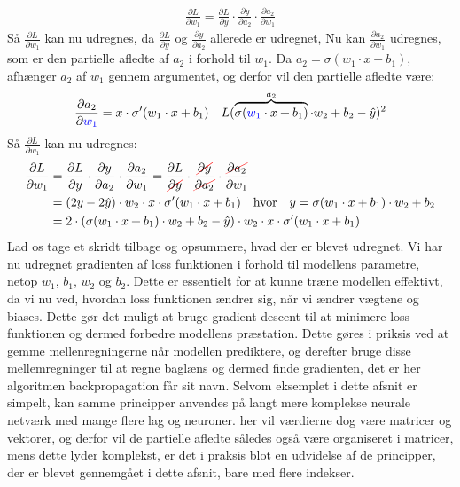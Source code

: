 \documentclass{article}
\newcommand\Ccancel[2][black]{
    \let\OldcancelColor\CancelColor
    \renewcommand\CancelColor{\color{#1}}
    \cancel{#2}
    \renewcommand\CancelColor{\OldcancelColor}
}
\begin{document}
\begin{align}
  \frac{\partial L}{\partial w_1} = \frac{\partial L}{\partial y} \cdot \frac{\partial y}{\partial a_2} \cdot \frac{\partial a_2}{\partial w_1}
\end{align}
Så $\frac{\partial L}{\partial w_1}$ kan nu udregnes, da $\frac{\partial L}{\partial y}$ og $\frac{\partial y}{\partial a_2}$ allerede er udregnet, Nu kan $\frac{\partial a_2}{\partial w_1}$ udregnes, som er den partielle afledte af $a_2$ i forhold til $w_1$. Da $a_2 = \sigma(w_1 \cdot x + b_1)$, afhænger $a_2$ af $w_1$ gennem argumentet, og derfor vil den partielle afledte være:
\begin{align}
  \frac{\partial a_2}{\partial {\color{blue}w_1}} = x \cdot \sigma'(w_1 \cdot x + b_1) && L(\overbrace{\sigma({\color{blue}w_1} \cdot x + b_1)}^{a_2} \cdot w_2 + b_2  - \hat{y})^2
\end{align}
Så $\frac{\partial L}{\partial w_1}$ kan nu udregnes:
\begin{align}
  \frac{\partial L}{\partial w_1} &= \frac{\partial L}{\partial y} \cdot \frac{\partial y}{\partial a_2} \cdot \frac{\partial a_2}{\partial w_1} = \frac{\partial L}{\Ccancel[red]{\partial y}} \cdot \frac{\Ccancel[red]{\partial y}}{\Ccancel[red]{\partial a_2}} \cdot \frac{\Ccancel[red]{\partial a_2}}{\partial w_1}\\
  &= (2y - 2\hat{y}) \cdot w_2 \cdot x \cdot \sigma'(w_1 \cdot x + b_1) \quad\text{hvor}\quad y = \sigma(w_1 \cdot x + b_1) \cdot w_2 + b_2\\
  &= 2\cdot(\sigma(w_1 \cdot x + b_1) \cdot w_2 + b_2 - \hat{y}) \cdot w_2 \cdot x \cdot \sigma'(w_1 \cdot x + b_1)
\end{align}
Lad os tage et skridt tilbage og opsummere, hvad der er blevet udregnet. Vi har nu udregnet gradienten af loss funktionen i forhold til modellens parametre, netop $w_1$, $b_1$, $w_2$ og $b_2$. Dette er essentielt for at kunne træne modellen effektivt, da vi nu ved, hvordan loss funktionen ændrer sig, når vi ændrer vægtene og biases. Dette gør det muligt at bruge gradient descent til at minimere loss funktionen og dermed forbedre modellens præstation. Dette gøres i priksis ved at gemme mellenregningerne når modellen prediktere, og derefter bruge disse mellemregninger til at regne baglæns og dermed finde gradienten, det er her algoritmen backpropagation får sit navn. Selvom eksemplet i dette afsnit er simpelt, kan samme principper anvendes på langt mere komplekse neurale netværk med mange flere lag og neuroner. her vil værdierne dog være matricer og vektorer, og derfor vil de partielle afledte således også være organiseret i matricer, mens dette lyder komplekst, er det i praksis blot en udvidelse af de principper, der er blevet gennemgået i dette afsnit, bare med flere indekser.\\\\
\end{document}
